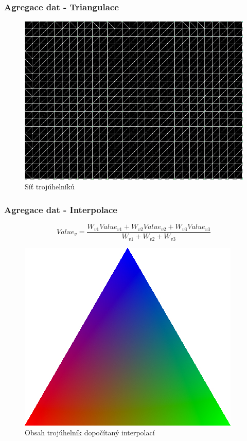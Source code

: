 \documentclass{beamer}
\begin{document}
	\begin{frame}
		\frametitle{Agregace dat - Triangulace}
		
		\begin{figure}
			
			\includegraphics[scale=0.5]{figures/bmp_sit.png}
			\caption{Síť trojúhelníků}
			
		\end{figure}
		
	\end{frame}
	
	\begin{frame}
		\frametitle{Agregace dat - Interpolace}
		
		\begin{displaymath}
			Value_v = \frac{W_{v1}Value_{v1} + W_{v2}Value_{v2} + W_{v3}Value_{v3}}{W_{v1} + W_{v2} + W_{v3}}
		\end{displaymath}
		
		\begin{figure}
			
			\includegraphics[scale=0.25]{figures/interpolace_trojuhelnik.jpg}
			\caption{Obsah trojúhelník dopočítaný interpolací \cite{coltrian}}
			
		\end{figure}
		
	\end{frame}
	
\end{document}
